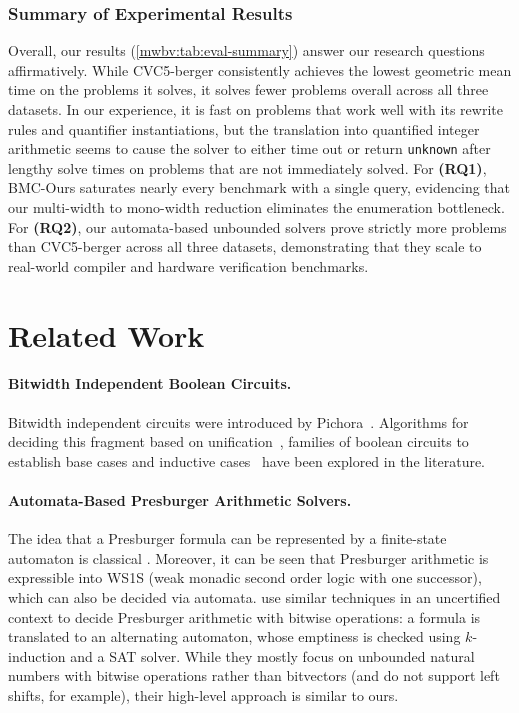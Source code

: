 \subsubsection{Summary of Experimental Results}

Overall, our results (\cref{mwbv:tab:eval-summary}) answer our research questions affirmatively.
While CVC5-berger consistently achieves the lowest geometric mean time on the problems it solves,
it solves fewer problems overall across all three datasets.
In our experience, it is fast on problems that work well with its rewrite rules and quantifier instantiations,
but the translation into quantified integer arithmetic seems to cause the solver to either time out or return \texttt{unknown} after lengthy solve times
on problems that are not immediately solved.
For \textbf{(RQ1)}, BMC-Ours saturates nearly every benchmark with a single \qfbv{} query,
evidencing that our multi-width to mono-width reduction eliminates the enumeration bottleneck.
For \textbf{(RQ2)}, our automata-based unbounded solvers prove strictly more problems than CVC5-berger across all three datasets,
demonstrating that they scale to real-world compiler and hardware verification benchmarks.


\section{Related Work}
\label{sec:pbv:related}

\paragraph{Bitwidth Independent Boolean Circuits.}
Bitwidth independent circuits were introduced by Pichora~\cite{pichora2003automated}.
Algorithms for deciding this fragment based on unification~\cite{bjorner1998deciding},
families of boolean circuits to establish base cases and inductive cases~\citep{gupta1993parametric,gupta1993representation}
have been explored in the literature.

\paragraph{Automata-Based Presburger Arithmetic Solvers.}
The idea that a Presburger formula can be represented by a finite-state automaton is classical \cite{buchi1990weak}.
Moreover, it can be seen that Presburger arithmetic is expressible into WS1S (weak monadic second order logic with one successor),
which can also be decided via automata.
%
\citet{automata-strike-back} use similar techniques in an uncertified context to
decide Presburger arithmetic with bitwise operations: a formula is translated
to an alternating automaton, whose emptiness is checked using $k$-induction and
a SAT solver.
%
While they mostly focus on unbounded natural numbers with bitwise operations
rather than bitvectors (and do not support left shifts, for example), their
high-level approach is similar to ours.


